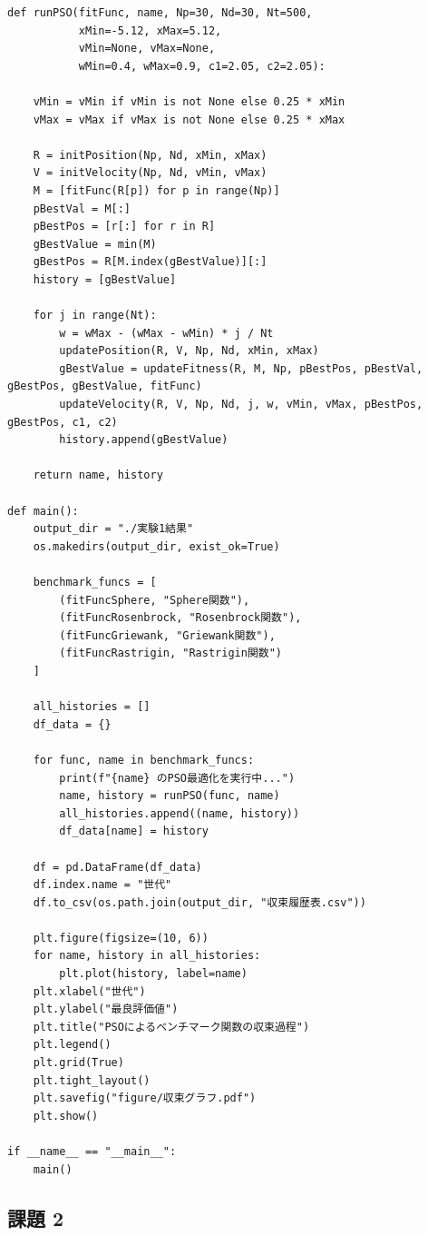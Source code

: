 \begin{lstlisting}[caption=PSOによるベンチマーク関数の最適化, label=lst:pso_code]
def runPSO(fitFunc, name, Np=30, Nd=30, Nt=500,
           xMin=-5.12, xMax=5.12,
           vMin=None, vMax=None,
           wMin=0.4, wMax=0.9, c1=2.05, c2=2.05):

    vMin = vMin if vMin is not None else 0.25 * xMin
    vMax = vMax if vMax is not None else 0.25 * xMax

    R = initPosition(Np, Nd, xMin, xMax)
    V = initVelocity(Np, Nd, vMin, vMax)
    M = [fitFunc(R[p]) for p in range(Np)]
    pBestVal = M[:]
    pBestPos = [r[:] for r in R]
    gBestValue = min(M)
    gBestPos = R[M.index(gBestValue)][:]
    history = [gBestValue]

    for j in range(Nt):
        w = wMax - (wMax - wMin) * j / Nt
        updatePosition(R, V, Np, Nd, xMin, xMax)
        gBestValue = updateFitness(R, M, Np, pBestPos, pBestVal, gBestPos, gBestValue, fitFunc)
        updateVelocity(R, V, Np, Nd, j, w, vMin, vMax, pBestPos, gBestPos, c1, c2)
        history.append(gBestValue)
    
    return name, history

def main():
    output_dir = "./実験1結果"
    os.makedirs(output_dir, exist_ok=True)

    benchmark_funcs = [
        (fitFuncSphere, "Sphere関数"),
        (fitFuncRosenbrock, "Rosenbrock関数"),
        (fitFuncGriewank, "Griewank関数"),
        (fitFuncRastrigin, "Rastrigin関数")
    ]

    all_histories = []
    df_data = {}

    for func, name in benchmark_funcs:
        print(f"{name} のPSO最適化を実行中...")
        name, history = runPSO(func, name)
        all_histories.append((name, history))
        df_data[name] = history

    df = pd.DataFrame(df_data)
    df.index.name = "世代"
    df.to_csv(os.path.join(output_dir, "収束履歴表.csv"))

    plt.figure(figsize=(10, 6))
    for name, history in all_histories:
        plt.plot(history, label=name)
    plt.xlabel("世代")
    plt.ylabel("最良評価値")
    plt.title("PSOによるベンチマーク関数の収束過程")
    plt.legend()
    plt.grid(True)
    plt.tight_layout()
    plt.savefig("figure/収束グラフ.pdf")
    plt.show()

if __name__ == "__main__":
    main()
\end{lstlisting}



\subsection{課題 2}


